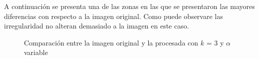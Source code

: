 \documentclass[a4paper]{article}
\begin{document}
A continuación se presenta una de las zonas en las que se presentaron las mayores diferencias con respecto a la imagen original. Como puede observare las irregularidad no alteran demasiado a la imagen en este caso. 
 \begin{figure}[H]
\centering
{}
\end{figure}
\begin{figure}[H]
\centering
{}
\caption{Comparación entre la imagen original y la procesada con $k$  = 3 y $\alpha$ variable}
\end{figure}
    
\end{document}
